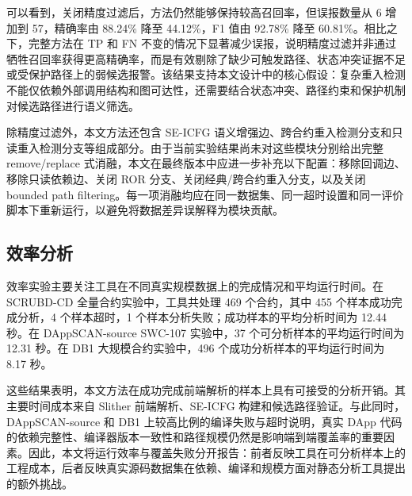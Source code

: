 可以看到，关闭精度过滤后，方法仍然能够保持较高召回率，但误报数量从 6 增加到 57，精确率由 88.24\% 降至 44.12\%，F1 值由 92.78\% 降至 60.81\%。相比之下，完整方法在 TP 和 FN 不变的情况下显著减少误报，说明精度过滤并非通过牺牲召回率获得更高精确率，而是有效剔除了缺少可触发路径、状态冲突证据不足或受保护路径上的弱候选报警。该结果支持本文设计中的核心假设：复杂重入检测不能仅依赖外部调用结构和图可达性，还需要结合状态冲突、路径约束和保护机制对候选路径进行语义筛选。

除精度过滤外，本文方法还包含 SE-ICFG 语义增强边、跨合约重入检测分支和只读重入检测分支等组成部分。由于当前实验结果尚未对这些模块分别给出完整 remove/replace 式消融，本文在最终版本中应进一步补充以下配置：移除回调边、移除只读依赖边、关闭 ROR 分支、关闭经典/跨合约重入分支，以及关闭 bounded path filtering。每一项消融均应在同一数据集、同一超时设置和同一评价脚本下重新运行，以避免将数据差异误解释为模块贡献。

\subsection{效率分析}

效率实验主要关注工具在不同真实规模数据上的完成情况和平均运行时间。在 SCRUBD-CD 全量合约实验中，工具共处理 469 个合约，其中 455 个样本成功完成分析，4 个样本超时，1 个样本分析失败；成功样本的平均分析时间为 12.44 秒。在 DAppSCAN-source SWC-107 实验中，37 个可分析样本的平均运行时间为 12.31 秒。在 DB1 大规模合约实验中，496 个成功分析样本的平均运行时间为 8.17 秒。

这些结果表明，本文方法在成功完成前端解析的样本上具有可接受的分析开销。其主要时间成本来自 Slither 前端解析、SE-ICFG 构建和候选路径验证。与此同时，DAppSCAN-source 和 DB1 上较高比例的编译失败与超时说明，真实 DApp 代码的依赖完整性、编译器版本一致性和路径规模仍然是影响端到端覆盖率的重要因素。因此，本文将运行效率与覆盖失败分开报告：前者反映工具在可分析样本上的工程成本，后者反映真实源码数据集在依赖、编译和规模方面对静态分析工具提出的额外挑战。
